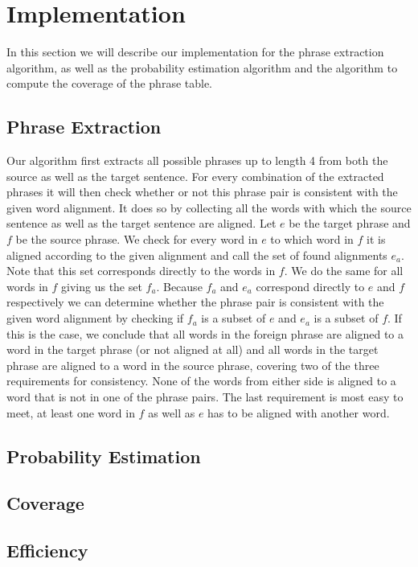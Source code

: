 \documentclass[11pt]{article}
\begin{document}
\section{Implementation}
In this section we will describe our implementation for the phrase extraction algorithm, as well as the probability estimation algorithm and the algorithm to compute the coverage of the phrase table. 

\subsection{Phrase Extraction}
\label{implem1}
Our algorithm first extracts all possible phrases up to length 4 from both the source as well as the target sentence. For every combination of the extracted phrases it will then check whether or not this phrase pair is consistent with the given word alignment. It does so by collecting all the words with which the source sentence as well as the target sentence are aligned. Let $e$ be the target phrase and $f$ be the source phrase. We check for every word in $e$ to which word in $f$ it is aligned according to the given alignment and call the set of found alignments $e_a$. Note that this set corresponds directly to the words in $f$. We do the same for all words in $f$ giving us the set $f_a$. Because $f_a$ and $e_a$ correspond directly to $e$ and $f$ respectively we can determine whether the phrase pair is consistent with the given word alignment by checking if $f_a$ is a subset of $e$ and $e_a$ is a subset of $f$. If this is the case, we conclude that all words in the foreign phrase are aligned to a word in the target phrase (or not aligned at all) and all words in the target phrase are aligned to a word in the source phrase, covering two of the three requirements for consistency. None of the words from either side is aligned to a word that is not in one of the phrase pairs. The last requirement is most easy to meet, at least one word in $f$ as well as $e$ has to be aligned with another word.

\subsection{Probability Estimation}
\label{implem2}

\subsection{Coverage}
\label{implem2}


\subsection{Efficiency}
\end{document}
